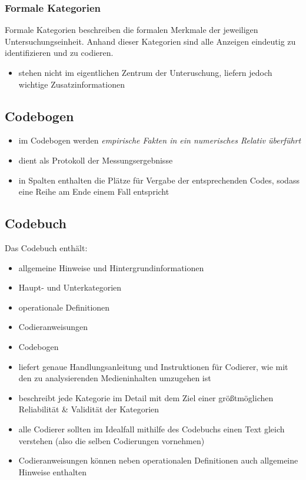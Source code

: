 \documentclass[11pt]{article}
\begin{document}
\subsubsection{Formale Kategorien}
\label{sec:org00b637a}
Formale Kategorien beschreiben die formalen Merkmale der jeweiligen Untersuchungseinheit. Anhand dieser Kategorien sind alle Anzeigen eindeutig zu identifizieren und zu codieren.
\begin{itemize}
\item stehen nicht im eigentlichen Zentrum der Unteruschung, liefern jedoch wichtige Zusatzinformationen
\end{itemize}
\subsection{Codebogen}
\label{sec:org4e0f540}
\begin{itemize}
\item im Codebogen werden \emph{empirische Fakten in ein numerisches Relativ überführt}
\item dient als Protokoll der Messungsergebnisse
\item in Spalten enthalten die Plätze für Vergabe der entsprechenden Codes, sodass eine Reihe am Ende einem Fall entspricht
\end{itemize}
\subsection{Codebuch}
\label{sec:org7202990}
Das Codebuch enthält:
\begin{itemize}
\item allgemeine Hinweise und Hintergrundinformationen
\item Haupt- und Unterkategorien
\item operationale Definitionen
\item Codieranweisungen
\item Codebogen

\item liefert genaue Handlungsanleitung und Instruktionen für Codierer, wie mit den zu analysierenden Medieninhalten umzugehen ist
\item beschreibt jede Kategorie im Detail mit dem Ziel einer größtmöglichen Reliabilität \& Validität der Kategorien
\item alle Codierer sollten im Idealfall mithilfe des Codebuchs einen Text gleich verstehen (also die selben Codierungen vornehmen)
\item Codieranweisungen können neben operationalen Definitionen auch allgemeine Hinweise enthalten
\end{itemize}
\end{document}
